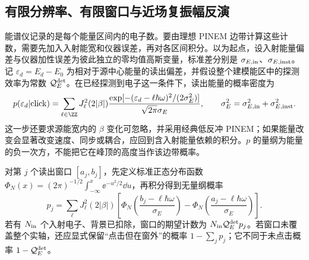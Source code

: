 \subsection{有限分辨率、有限窗口与近场复振幅反演}
\label{sec:electron-detector-inversion-worked}

能谱仪记录的是每个能量区间内的电子数。要由理想 PINEM 边带计算这些计数，需要先加入入射能宽和仪器误差，再对各区间积分。以为起点，设入射能量偏差与仪器加性误差为彼此独立的零均值高斯变量，标准差分别是 $\sigma_{E,\rm in}$、$\sigma_{E,\rm inst}$。记 $\varepsilon_d=E_d-E_0$ 为相对于源中心能量的读出偏差，并假设整个建模能区中的探测效率为常数 $\mathcal Q_E^{\rm det}$。在已经探测到电子这一条件下，读出能量的概率密度为
\begin{equation}
 p(\varepsilon_d|{\rm click})
 =\sum_{\ell\in\ZZ}J_\ell^2(2|\beta|)
 \frac{\exp[-(\varepsilon_d-\ell\hbar\omega)^2/(2\sigma_E^2)]}{\sqrt{2\pi}\sigma_E},
 \qquad \sigma_E^2=\sigma_{E,\rm in}^2+\sigma_{E,\rm inst}^2.
 \label{eq:electron-detector-gaussian-comb}
\end{equation}
这一步还要求源能宽内的 $\beta$ 变化可忽略，并采用经典低反冲 PINEM；如果能量改变会显著改变速度、同步或耦合，应回到含入射能量依赖的积分。$p$ 的量纲为能量的负一次方，不能把它在峰顶的高度当作该边带概率。

对第 $j$ 个读出窗口 $[a_j,b_j]$，先定义标准正态分布函数
$\Phi_N(x)=(2\pi)^{-1/2}\int_{-\infty}^x\ee^{-u^2/2}\dd u$，再积分得到无量纲概率
\begin{equation}
 p_j=\sum_\ell J_\ell^2(2|\beta|)
 \left[\Phi_N\!\left(\frac{b_j-\ell\hbar\omega}{\sigma_E}\right)
       -\Phi_N\!\left(\frac{a_j-\ell\hbar\omega}{\sigma_E}\right)\right].
 \label{eq:electron-detector-bin-probabilities}
\end{equation}
若有 $N_{\rm in}$ 个入射电子、背景已扣除，窗口的期望计数为 $N_{\rm in}\mathcal Q_E^{\rm det}p_j$。若窗口未覆盖整个实轴，还应显式保留“点击但在窗外”的概率 $1-\sum_jp_j$；它不同于未点击概率 $1-\mathcal Q_E^{\rm det}$。

